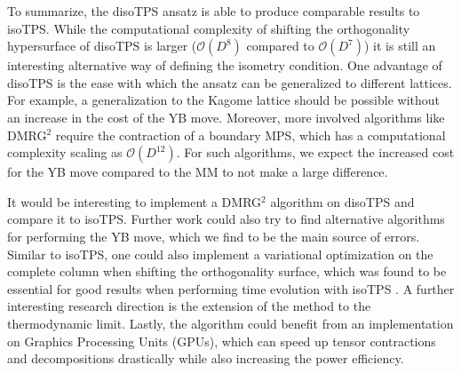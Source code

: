 To summarize, the disoTPS ansatz is able to produce comparable results to isoTPS. While the computational complexity of shifting the orthogonality hypersurface of disoTPS is larger ($\mathcal{O}(D^8)$ compared to $\mathcal{O}(D^7)$) it is still an interesting alternative way of defining the isometry condition. One advantage of disoTPS is the ease with which the ansatz can be generalized to different lattices. For example, a generalization to the Kagome lattice should be possible without an increase in the cost of the YB move. Moreover, more involved algorithms like DMRG$^2$ require the contraction of a boundary MPS, which has a computational complexity scaling as $\mathcal{O}(D^{12})$. For such algorithms, we expect the increased cost for the YB move compared to the MM to not make a large difference. \par
It would be interesting to implement a DMRG$^2$ algorithm on disoTPS and compare it to isoTPS. Further work could also try to find alternative algorithms for performing the YB move, which we find to be the main source of errors. Similar to isoTPS, one could also implement a variational optimization on the complete column when shifting the orthogonality surface, which was found to be essential for good results when performing time evolution with isoTPS \cite{cite:efficient_simulation_of_dynamics_in_two_dimensional_quantum_spin_systems}. A further interesting research direction is the extension of the method to the thermodynamic limit. Lastly, the algorithm could benefit from an implementation on Graphics Processing Units (GPUs), which can speed up tensor contractions and decompositions drastically while also increasing the power efficiency.